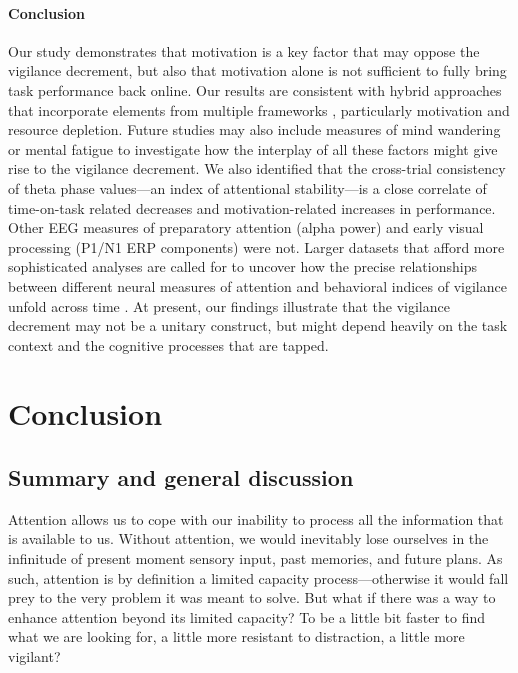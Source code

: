 \documentclass[11pt,english,]{memoir}
\begin{document}
\hypertarget{conclusion}{%
\subsection{Conclusion}\label{conclusion}}

Our study demonstrates that motivation is a key factor that may oppose the vigilance decrement, but also that motivation alone is not sufficient to fully bring task performance back online. Our results are consistent with hybrid approaches that incorporate elements from multiple frameworks \autocites{Christie2015}{Thomson2015}, particularly motivation and resource depletion. Future studies may also include measures of mind wandering \autocite{Smallwood2006} or mental fatigue \autocite{Johnston2018} to investigate how the interplay of all these factors might give rise to the vigilance decrement. We also identified that the cross-trial consistency of theta phase values---an index of attentional stability---is a close correlate of time-on-task related decreases and motivation-related increases in performance. Other EEG measures of preparatory attention (alpha power) and early visual processing (P1/N1 ERP components) were not. Larger datasets that afford more sophisticated analyses are called for to uncover how the precise relationships between different neural measures of attention and behavioral indices of vigilance unfold across time \autocite{Wang2018}. At present, our findings illustrate that the vigilance decrement may not be a unitary construct, but might depend heavily on the task context and the cognitive processes that are tapped.

\hypertarget{part-conclusion}{%
\part{Conclusion}\label{part-conclusion}}

\hypertarget{summary-and-general-discussion}{%
\chapter{Summary and general discussion}\label{summary-and-general-discussion}}

Attention allows us to cope with our inability to process all the information that is available to us. Without attention, we would inevitably lose ourselves in the infinitude of present moment sensory input, past memories, and future plans. As such, attention is by definition a limited capacity process---otherwise it would fall prey to the very problem it was meant to solve. But what if there was a way to enhance attention beyond its limited capacity? To be a little bit faster to find what we are looking for, a little more resistant to distraction, a little more vigilant?
\end{document}

